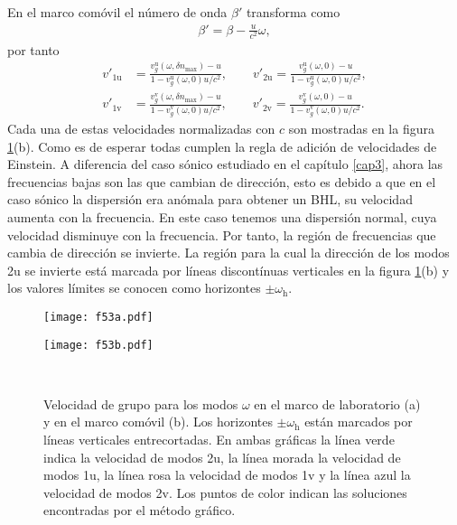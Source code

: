 En el marco com\'{o}vil el n\'{u}mero de onda $\beta ' $ transforma como
\begin{align}
\beta'=\beta-\frac{u}{c^2}\omega,
\end{align}
por tanto 
\begin{align}
\nonumber v'_{\text{1u}}&=\frac{v_g^{\text{u}}(\omega,\delta n_{\text{max}})-u}{1-v_g^{\text{u}}(\omega,0)u/c^2}, \qquad v'_{2\text{u}}=\frac{v_g^{\text{u}}(\omega,0)-u}{1-v_g^{\text{u}}(\omega,0)u/c^2},\\
 v'_{\text{1v}}&=\frac{v_g^{\text{v}}(\omega,\delta n_{\text{max}})-u}{1-v_g^{\text{v}}(\omega,0)u/c^2}, \qquad v'_{2\text{v}}=\frac{v_g^{\text{v}}(\omega,0)-u}{1-v_g^{\text{v}}(\omega,0)u/c^2}.
\end{align}
Cada una de estas velocidades normalizadas con $c$ son mostradas en la figura \ref{fig:5.2}(b). Como es de esperar todas cumplen la regla de adici\'{o}n de velocidades de Einstein. A diferencia del caso sónico estudiado en el cap\'{i}tulo \ref{cap3}, ahora las frecuencias bajas son las que cambian de dirección, esto es debido a que en el caso sónico la dispersión era anómala para obtener un BHL, su velocidad aumenta con la frecuencia. En este caso tenemos una dispersión normal, cuya velocidad disminuye con la frecuencia. Por tanto, la región de frecuencias que cambia de dirección se invierte. La regi\'{o}n para la cual la direcci\'{o}n de los modos 2u se invierte est\'a marcada por l\'{i}neas discont\'{i}nuas verticales en la figura \ref{fig:5.2}(b) y los valores l\'{i}mites se conocen como horizontes $\pm \omega_\text{h}$.

\begin{center}
\begin{figure}[h]
\begin{minipage}[c]{0.5\textwidth}
\texttt{[image: f53a.pdf]}
  \end{minipage}%
\begin{minipage}[c]{0.5\textwidth}
\texttt{[image: f53b.pdf]}
\end{minipage}\\[2pt]                 
\caption {Velocidad de grupo para los modos $\omega$ en el marco de laboratorio (a) y en el marco com\'{o}vil (b).  Los horizontes $\pm \omega_\text{h}$ están marcados por líneas verticales entrecortadas. En ambas gr\'{a}ficas la l\'{i}nea verde indica la velocidad de modos 2u, la l\'{i}nea morada la velocidad de modos 1u, la l\'{i}nea rosa la velocidad de modos 1v y  la l\'{i}nea azul la velocidad de modos 2v. Los puntos de color indican las soluciones encontradas por el m\'{e}todo gr\'{a}fico.} 
   \label{fig:5.2}  
\end{figure}

\end{center}


